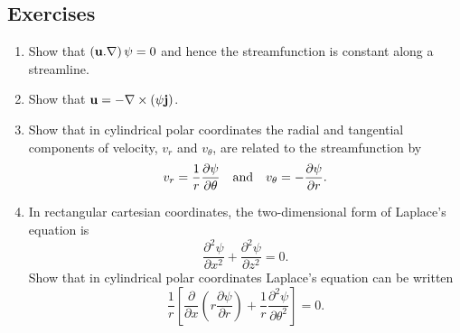 \documentclass[twoside,a4paper,11pt]{report}
\begin{document}
\subsection*{Exercises}

\begin{enumerate}
\item Show that $\left( {{{\bf u}}. \nabla } \right)\psi =0$ and hence 
the streamfunction is constant along a streamline.

\item Show that ${{\bf u}}=-\nabla \times \left( {\psi {{\bf j}}} 
\right)$.

\item Show that in cylindrical polar coordinates the radial and tangential 
components of velocity, $v_{r}$ and $v_{\theta }$, are related to the 
streamfunction by
\[ v_r =\frac{1}{r}\frac{\partial \psi }{\partial \theta } \quad\hbox{and}\quad v_\theta 
=-\frac{\partial \psi }{\partial r}. \]

\item  In rectangular cartesian coordinates, the two-dimensional form of 
Laplace's equation is 
\[ \frac{\partial ^2\psi }{\partial 
x^2}+\frac{\partial ^2\psi }{\partial z^2}=0. \]
 Show that in cylindrical 
polar coordinates Laplace's equation can be written
\[
\frac{1}{r}\left[ {\frac{\partial }{\partial x}\left( {r\frac{\partial 
\psi }{\partial r}} \right)+\frac{1}{r}\frac{\partial ^2\psi 
}{\partial \theta ^2}} \right]=0.
\]
\end{enumerate}
\end{document}
